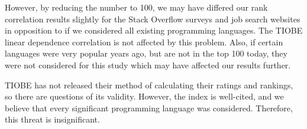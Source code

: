\documentclass[conference]{IEEEtran}
\begin{document}
However, by reducing the number to 100, we may have differed our rank correlation results slightly for the Stack Overflow surveys and job search websites in opposition to if we considered all existing programming languages. The TIOBE linear dependence correlation is not affected by this problem. Also, if certain languages were very popular years ago, but are not in the top 100 today, they were not considered for this study which may have affected our results further.

TIOBE has not released their method of calculating their ratings and rankings, so there are questions of its validity. However, the index is well-cited, and we believe that every significant programming language was considered. Therefore, this threat is insignificant.



\end{document}
